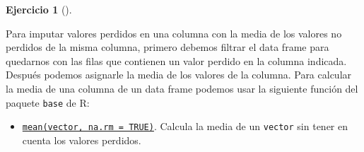 \documentclass[
  a4paper,
]{scrreport}
\newenvironment{Shaded}{\begin{snugshade}}{\end{snugshade}}
\newcommand{\AttributeTok}[1]{\textcolor[rgb]{0.40,0.45,0.13}{#1}}
\newcommand{\ConstantTok}[1]{\textcolor[rgb]{0.56,0.35,0.01}{#1}}
\newcommand{\FunctionTok}[1]{\textcolor[rgb]{0.28,0.35,0.67}{#1}}
\newcommand{\NormalTok}[1]{\textcolor[rgb]{0.00,0.23,0.31}{#1}}
\newcommand{\OtherTok}[1]{\textcolor[rgb]{0.00,0.23,0.31}{#1}}
\newcommand{\SpecialCharTok}[1]{\textcolor[rgb]{0.37,0.37,0.37}{#1}}
\providecommand{\tightlist}{%
  \setlength{\itemsep}{0pt}\setlength{\parskip}{0pt}}\usepackage{longtable,booktabs,array}
\theoremstyle{definition}
\newtheorem{exercise}{Ejercicio}[chapter]
\theoremstyle{remark}
\begin{document}
\begin{exercise}[]
\begin{enumerate}
\begin{tcolorbox}
  Para imputar valores perdidos en una columna con la media de los
  valores no perdidos de la misma columna, primero debemos filtrar el
  data frame para quedarnos con las filas que contienen un valor perdido
  en la columna indicada. Después podemos asignarle la media de los
  valores de la columna. Para calcular la media de una columna de un
  data frame podemos usar la siguiente función del paquete \texttt{base}
  de R:

  \begin{itemize}
  \tightlist
  \item
    \href{https://rdrr.io/r/base/mean.html}{\texttt{mean(vector,\ na.rm\ =\ TRUE)}}.
    Calcula la media de un \texttt{vector} sin tener en cuenta los
    valores perdidos.
  \end{itemize}

\begin{Shaded}
\end{Shaded}


\end{tcolorbox}
\end{enumerate}
\end{exercise}
\end{document}

